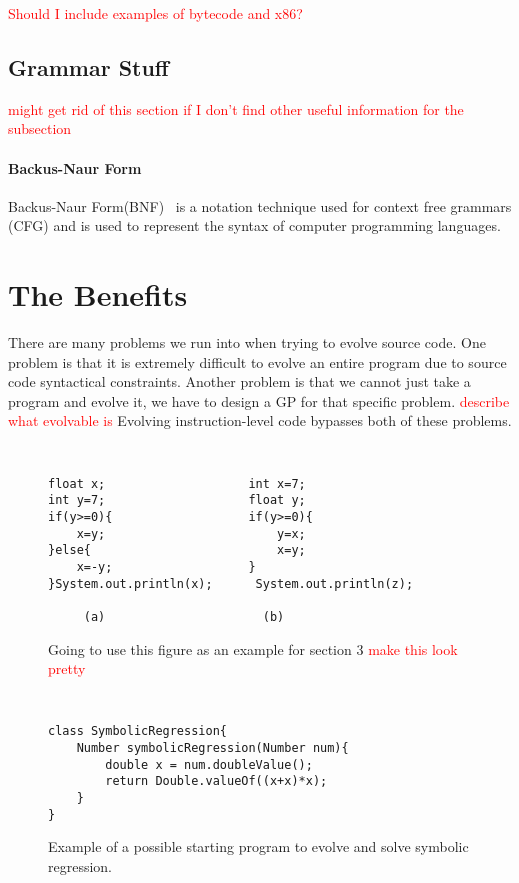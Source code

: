 \documentclass{sig-alternate}
\newcommand{\mycomment}[1]{\textcolor{red}{#1}}
\begin{document}
\mycomment{Should I include examples of bytecode and x86?}


\subsection{Grammar Stuff}
\mycomment{might get rid of this section if I don't find other useful information for the subsection}
\paragraph{Backus-Naur Form}
	Backus-Naur Form(BNF)~\cite{BNF:2014} is a notation technique used for context free grammars (CFG) and is used to represent the syntax of computer programming languages. 



\section{The Benefits}

There are many problems we run into when trying to evolve source code. One problem is that it is extremely difficult to evolve an entire program due to source code syntactical constraints. Another problem is that we cannot just take a program and evolve it, we have to design  a GP for that specific problem. \mycomment{describe what evolvable is} Evolving instruction-level code bypasses both of these problems.

\begin{figure}
\centering
{\tt
\begin{verbatim}
float x;                    int x=7;
int y=7;                    float y;
if(y>=0){                   if(y>=0){
    x=y;                        y=x;
}else{                          x=y;
    x=-y;                   }
}System.out.println(x);      System.out.println(z);	
     
     (a)                      (b)

\end{verbatim}
}
\caption{Going to use this figure as an example for section 3 \mycomment{make this look pretty}}
\end{figure}


\begin{figure}
\centering
{\tt
\begin{verbatim}
class SymbolicRegression{
    Number symbolicRegression(Number num){
        double x = num.doubleValue();
        return Double.valueOf((x+x)*x);
    }
}

\end{verbatim}
}
\caption{Example of a possible starting program to evolve and solve symbolic regression.}
\end{figure}
\end{document}
